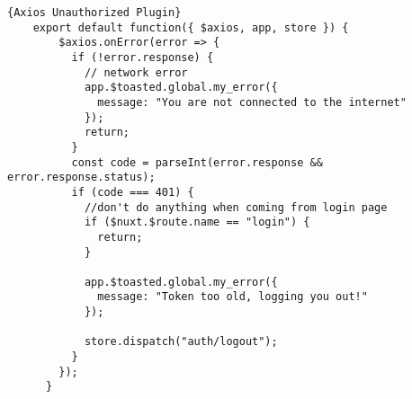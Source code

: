 \begin{lstlisting}[caption=Axios Unauthorized Plugin, captionpos=b, style=htmlcssjs, label=unauthorized]{Axios Unauthorized Plugin}
    export default function({ $axios, app, store }) {
        $axios.onError(error => {
          if (!error.response) {
            // network error
            app.$toasted.global.my_error({
              message: "You are not connected to the internet"
            });
            return;
          }
          const code = parseInt(error.response && error.response.status);
          if (code === 401) {
            //don't do anything when coming from login page
            if ($nuxt.$route.name == "login") {
              return;
            }
      
            app.$toasted.global.my_error({
              message: "Token too old, logging you out!"
            });
      
            store.dispatch("auth/logout");
          }
        });
      }
      
\end{lstlisting}